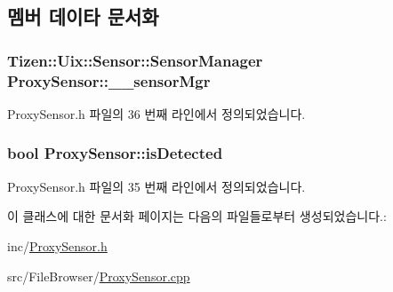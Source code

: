 \subsection{멤버 데이타 문서화}
\hypertarget{class_proxy_sensor_afa7f75c2ad489dd958cf07c8d11196a0}{
\subsubsection[{\+\_\+\+\_\+sensor\+Mgr}]{\setlength{\rightskip}{0pt plus 5cm}Tizen\+::\+Uix\+::\+Sensor\+::\+Sensor\+Manager Proxy\+Sensor\+::\+\_\+\+\_\+sensor\+Mgr\hspace{0.3cm}{\ttfamily [private]}}}\label{class_proxy_sensor_afa7f75c2ad489dd958cf07c8d11196a0}


Proxy\+Sensor.\+h 파일의 36 번째 라인에서 정의되었습니다.

\hypertarget{class_proxy_sensor_a508bdca3572c905679378d23787b0acc}{
\subsubsection[{is\+Detected}]{\setlength{\rightskip}{0pt plus 5cm}bool Proxy\+Sensor\+::is\+Detected\hspace{0.3cm}{\ttfamily [private]}}}\label{class_proxy_sensor_a508bdca3572c905679378d23787b0acc}


Proxy\+Sensor.\+h 파일의 35 번째 라인에서 정의되었습니다.



이 클래스에 대한 문서화 페이지는 다음의 파일들로부터 생성되었습니다.\+:\begin{DoxyCompactItemize}
\item 
inc/\hyperlink{_proxy_sensor_8h}{Proxy\+Sensor.\+h}\item 
src/\+File\+Browser/\hyperlink{_proxy_sensor_8cpp}{Proxy\+Sensor.\+cpp}\end{DoxyCompactItemize}
